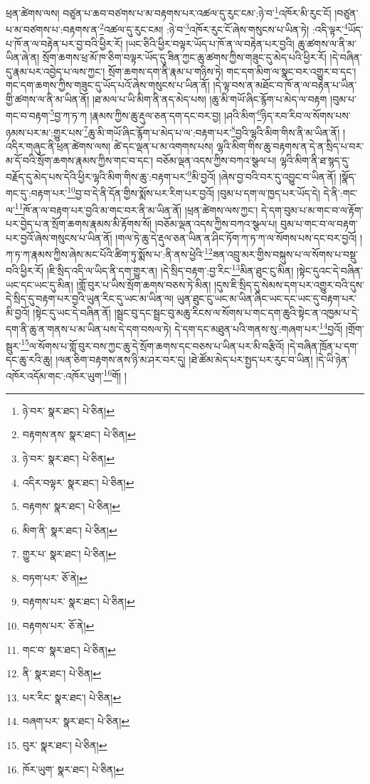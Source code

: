 ཕྲན་ཚེགས་ལས། བཙུན་པ་ཆབ་བཙགས་པ་མ་བརྟགས་པར་འཚལ་དུ་རུང་ངམ་:ཉེ་བ་\footnote{ཉེ་བར་  སྣར་ཐང་།  པེ་ཅིན། }འཁོར་མི་རུང་ངོ། །བཙུན་པ་མ་བཙགས་པ་:བརྟགས་ན་\footnote{བརྟགས་ནས་  སྣར་ཐང་།  པེ་ཅིན། }འཚལ་དུ་རུང་ངམ། :ཉེ་བ་\footnote{ཉེ་བར་  སྣར་ཐང་།  པེ་ཅིན། }འཁོར་རུང་ངོ་ཞེས་གསུངས་པ་ཡིན་ཏེ། :འདི་ལྟར་\footnote{འདིར་བལྟར་  སྣར་ཐང་།  པེ་ཅིན། }ཡོད་པ་ཁོ་ན་ལ་བརྟེན་པར་བྱ་བའི་ཕྱིར་རོ། །ཡང་ཅིའི་ཕྱིར་བལྟར་ཡོད་པ་ཁོ་ན་ལ་བརྟེན་པར་བྱའི། ཆུ་ཚགས་ལ་ནི་མ་ཡིན་ཞེ་ན། སྲོག་ཆགས་ཕྲ་མོ་ཁ་ཅིག་བལྟར་ཡོད་དུ་ཟིན་ཀྱང་ཆུ་ཚགས་ཀྱིས་གཟུང་དུ་མེད་པའི་ཕྱིར་རོ། །དེ་བཞིན་དུ་རྣམ་པར་འབྱེད་པ་ལས་ཀྱང་། སྲོག་ཆགས་དག་ནི་རྣམ་པ་གཉིས་ཏེ། གང་དག་མིག་ལ་སྣང་བར་འགྱུར་བ་དང་། གང་དག་ཆགས་ཀྱིས་གཟུང་དུ་ཡོད་པའོ་ཞེས་གསུངས་པ་ཡིན་ནོ། །དེ་ལྟ་བས་ན་མཐོང་བ་ཁོ་ན་ལ་བརྟེན་པ་ཡིན་གྱི་ཚགས་ལ་ནི་མ་ཡིན་ནོ། །ཐ་མལ་པ་ཡི་མིག་ནི་ནད་མེད་པས། །ཆུ་མི་གཡོ་ཞིང་རྙོག་པ་མེད་ལ་བརྟག །བུམ་པ་གང་བ་བརྟག་\footnote{བརྟགས་  སྣར་ཐང་།  པེ་ཅིན། }བྱ་ཀ་ཏ་ཀ །རྣམས་ཀྱིས་ཆུ་རྡུལ་ཅན་དག་དང་བར་བྱ། །ཤའི་མིག་\footnote{མིག་ནི་  སྣར་ཐང་།  པེ་ཅིན། }ཉིད་རབ་རིབ་ལ་སོགས་པས་ཉམས་པར་མ་:གྱུར་པས་\footnote{གྱུར་པ་  སྣར་ཐང་།  པེ་ཅིན། }ཆུ་མི་གཡོ་ཞིང་རྙོག་པ་མེད་པ་ལ་:བརྟག་པར་\footnote{བཏག་པར་  ཅོ་ནེ། }བྱའི་ལྷའི་མིག་གིས་ནི་མ་ཡིན་ནོ། །འདིར་གཞུང་ནི་ཕྲན་ཚེགས་ལས། ཚེ་དང་ལྡན་པ་མ་འགགས་པས། ལྷའི་མིག་གིས་ཆུ་བརྟགས་ན་དེ་ན་སྲིད་པ་བར་མ་དོ་བའི་སྲོག་ཆགས་རྣམས་ཀྱིས་གང་བ་དང་། བཅོམ་ལྡན་འདས་ཀྱིས་བཀའ་སྩལ་པ། ལྷའི་མིག་ནི་ཐ་སྙད་དུ་བརྗོད་དུ་མེད་པས་དེའི་ཕྱིར་ལྷའི་མིག་གིས་ཆུ་:བརྟག་པར་\footnote{བརྟགས་པར་  སྣར་ཐང་།  པེ་ཅིན། }མི་བྱའོ། །ཞེས་བྱ་བའི་བར་དུ་འབྱུང་བ་ཡིན་ནོ། །སྣོད་གང་དུ་:བརྟག་པར་\footnote{བརྟགས་པར་  ཅོ་ནེ། }བྱ་བ་དེ་ནི་དོན་གྱིས་སྨོས་པར་རིག་པར་བྱའོ། །བུམ་པ་དག་ལ་ཁྱད་པར་ཡོད་དེ། དེ་ནི་:གང་ལ་\footnote{གང་བ་  སྣར་ཐང་།  པེ་ཅིན། }ཁོ་ན་ལ་བརྟག་པར་བྱའི་མ་གང་བར་ནི་མ་ཡིན་ནོ། །ཕྲན་ཚེགས་ལས་ཀྱང་། དེ་དག་བུམ་པ་མ་གང་བ་ལ་རྟོག་པར་བྱེད་པ་ན་སྲོག་ཆགས་རྣམས་མི་རྟོགས་སོ། །བཅོམ་ལྡན་འདས་ཀྱིས་བཀའ་སྩལ་པ། བུམ་པ་གང་བ་ལ་བརྟག་པར་བྱའོ་ཞེས་གསུངས་པ་ཡིན་ནོ། །གལ་ཏེ་ཆུ་དེ་རྡུལ་ཅན་ཡིན་ན་ཤིང་ཏོག་ཀ་ཏ་ཀ་ལ་སོགས་པས་དང་བར་བྱའོ། །ཀ་ཏ་ཀ་རྣམས་ཀྱིས་ཞེས་མང་པོའི་ཚིག་ཏུ་སྨོས་པ་:ནི་ནས་ཕྱེའི་\footnote{ནི་  སྣར་ཐང་།  པེ་ཅིན། }ཟན་འབྲུ་མར་གྱིས་བསྐུས་པ་ལ་སོགས་པ་བསྡུ་བའི་ཕྱིར་རོ། །ཇི་སྲིད་འདི་ལ་ཡིད་ནི་དག་གྱུར་ན། །དེ་སྲིད་བརྟག་:བྱ་རིང་\footnote{པར་རིང་  སྣར་ཐང་།  པེ་ཅིན། }མིན་ཐུང་ངུ་མིན། །སྟེང་དུའང་དེ་བཞིན་ཡང་དང་ཡང་དུ་མིན། །གློ་བུར་པ་ཡིས་སྲོག་ཆགས་བཅས་ཏེ་མིན། །དུས་ཇི་སྲིད་དུ་སེམས་དག་པར་འགྱུར་བའི་དུས་དེ་སྲིད་དུ་བརྟག་པར་བྱའི་ཡུན་རིང་དུ་ཡང་མ་ཡིན་ལ། ཡུན་ཐུང་ངུ་ཡང་མ་ཡིན་ཞིང་ཡང་དང་ཡང་དུ་བརྟག་པར་མི་བྱའོ། །སྟེང་དུ་ཡང་དེ་བཞིན་ནོ། །སྦྲང་བུ་དང་སྦྲང་བུ་མཆུ་རིངས་ལ་སོགས་པ་གང་དག་ཆུའི་སྟེང་ན་འཁྱམ་པ་དེ་དག་ནི་ཆུ་ན་གནས་པ་མ་ཡིན་པས་དེ་དག་བསལ་ཏེ། དེ་དག་དང་མཐུན་པའི་གནས་སུ་:གཞག་པར་\footnote{བཞག་པར་  སྣར་ཐང་།  པེ་ཅིན། }བྱའོ། །གྲོག་སྦུར་\footnote{བུར་  སྣར་ཐང་།  པེ་ཅིན། }ལ་སོགས་པ་གློ་བུར་བས་ཀྱང་ཆུ་དེ་སྲོག་ཆགས་དང་བཅས་པ་ཡིན་པར་མི་བརྩིའོ། །དེ་བཞིན་ཁྲོན་པ་དག་དང་ཆུ་རའི་ཆུ། །ལན་ཅིག་བརྟགས་ནས་ཉི་མ་ཤར་བར་དུ། །ཐེ་ཚོམ་མེད་པར་སྤྱད་པར་རུང་བ་ཡིན། །དེ་ཡི་ཉེན་འཁོར་འདོམ་གང་:འཁོར་ཡུག་\footnote{ཁོར་ཡུག་  སྣར་ཐང་།  པེ་ཅིན། }གོ། །
